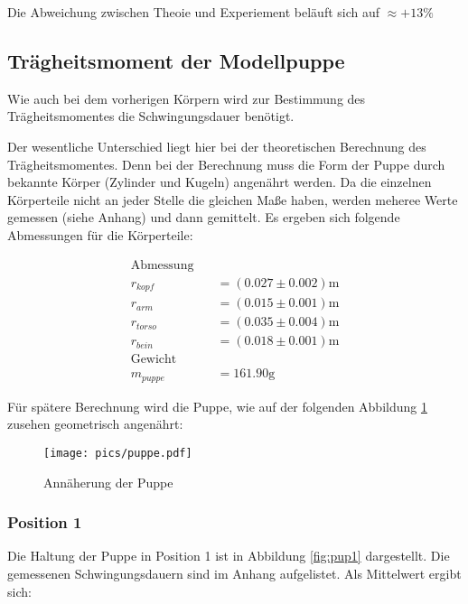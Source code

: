 Die Abweichung zwischen Theoie und Experiement beläuft sich auf $\approx +13 \%$ %

\subsection{Trägheitsmoment der Modellpuppe}

Wie auch bei dem vorherigen Körpern wird zur Bestimmung des Trägheitsmomentes
die Schwingungsdauer benötigt. %

Der wesentliche Unterschied liegt hier bei der theoretischen Berechnung des Trägheitsmomentes. %
Denn bei der Berechnung muss die Form der Puppe
durch bekannte Körper (Zylinder und Kugeln) angenährt werden.
Da die einzelnen Körperteile nicht an jeder Stelle die gleichen Maße haben,
werden meheree Werte gemessen (siehe Anhang) und dann gemittelt.
Es ergeben sich folgende Abmessungen für die Körperteile:

\begin{align*}
\text{Abmessung} \quad &\\
r_{kopf}&=\left(\num{0.027}\pm\num{0.002}\right)\si{\meter}\\
r_{arm}&=\left(\num{0.015}\pm\num{0.001}\right)\si{\meter}\\
r_{torso}&=\left(\num{0.035}\pm\num{0.004}\right)\si{\meter}\\
r_{bein}&=\left(\num{0.018}\pm\num{0.001}\right)\si{\meter}\\
\text{Gewicht} \quad &\\
m_{puppe}&=\num{161.90}\si{\gram}
\end{align*}

Für spätere Berechnung wird die Puppe, wie auf der folgenden Abbildung \ref{fig:approx_puppe} zusehen geometrisch angenährt: %


\begin{figure}
  \centering
  \texttt{[image: pics/puppe.pdf]}
  \caption{Annäherung der Puppe}
  \label{fig:approx_puppe}
\end{figure}

\subsubsection{Position 1}

Die Haltung der Puppe in Position 1 ist in Abbildung \ref{fig:pup1} dargestellt.
Die gemessenen Schwingungsdauern sind im Anhang aufgelistet.
Als Mittelwert ergibt sich:

